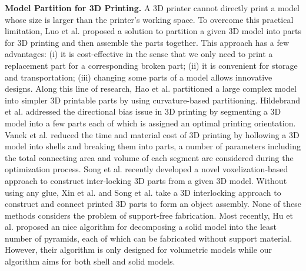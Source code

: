 \textbf{Model Partition for 3{D} Printing.} A 3{D} printer cannot directly print a model whose size is larger than the printer's working space. To overcome this practical limitation, Luo et al. \cite{LuoBRM12} proposed a solution to partition a given 3D model into parts for 3D printing and then assemble the parts together. This approach has a few advantages: (i) it is cost-effective in the sense that we only need to print a replacement part for a corresponding broken part; (ii) it is convenient for storage and transportation; (iii) changing some parts of a model allows innovative designs. Along this line of research, Hao et al. \cite{hao2011efficient} partitioned a large complex model into simpler 3D printable parts by using curvature-based partitioning. Hildebrand et al. \cite{HildebrandBA13} addressed the directional bias issue in 3D printing by segmenting a 3D model into a few parts each of which is assigned an optimal printing orientation. Vanek et al. \cite{VanekGBMCSM14} reduced the time and material cost of 3D printing by hollowing a 3D model into shells and breaking them into parts, a number of parameters including the total connecting area and volume of each segment are considered during the optimization process. Song et al. \cite{SongFLF15} recently developed a novel voxelization-based approach to construct inter-locking 3D parts from a given 3D model. Without using any glue, Xin et al. \cite{XinLFWHC11} and Song et al. \cite{SongFC12} take a 3D interlocking approach to construct and connect printed 3D parts to form an object assembly. None of these methods considers the problem of support-free fabrication. Most recently, Hu et al. \cite{Hu_siga14} proposed an nice algorithm for decomposing a solid model into the least number of pyramids, each of which can be fabricated without support material. However, their algorithm is only designed for volumetric models while our algorithm aims for both shell and solid models.





